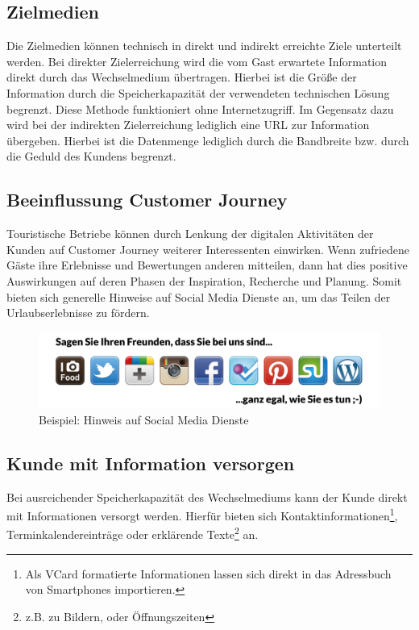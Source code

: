 \subsection{Zielmedien} %
\label{sub:zielmedien}
Die Zielmedien können technisch in direkt und indirekt erreichte Ziele unterteilt werden. Bei direkter Zielerreichung wird die vom Gast erwartete Information direkt durch das Wechselmedium übertragen. Hierbei ist die Größe der Information durch die Speicherkapazität der verwendeten technischen Lösung begrenzt. Diese Methode funktioniert ohne Internetzugriff.  Im Gegensatz dazu wird bei der indirekten Zielerreichung lediglich eine \ac{URL} zur Information übergeben. Hierbei ist die Datenmenge lediglich durch die Bandbreite bzw. durch die Geduld des Kundens begrenzt.

\subsection{Beeinflussung Customer Journey} %
\label{sub:beeinflussung_customer_journey}
Touristische Betriebe können durch Lenkung der digitalen Aktivitäten der Kunden auf Customer Journey weiterer Interessenten einwirken. Wenn zufriedene Gäste ihre Erlebnisse und Bewertungen anderen mitteilen, dann hat dies positive Auswirkungen auf deren Phasen der Inspiration, Recherche und Planung. Somit bieten sich generelle Hinweise auf Social Media Dienste an, um das Teilen der Urlaubserlebnisse zu fördern. 

\begin{figure}[H]
\begin{center}
\includegraphics[width=.8\textwidth]{zielcj.jpg}
\caption{Beispiel: Hinweis auf Social Media Dienste\protect\footnotemark}
\label{pic:zielcj}
\end{center}
\end{figure}

\subsection{Kunde mit Information versorgen} %
\label{sub:kunde_mit_information_versorgen}
Bei ausreichender Speicherkapazität des Wechselmediums kann der Kunde direkt mit Informationen versorgt werden. Hierfür bieten sich Kontaktinformationen\footnote{Als VCard formatierte Informationen lassen sich direkt in das Adressbuch von Smartphones importieren.}, Terminkalendereinträge oder erklärende Texte\footnote{z.B. zu Bildern, oder Öffnungszeiten} an.

